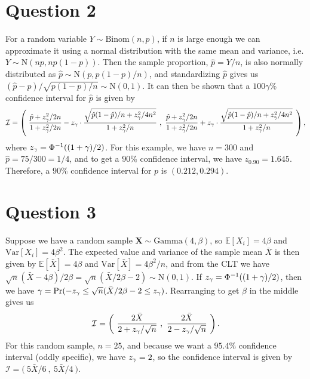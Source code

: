 \documentclass[10pt]{article}
\begin{document}
\section{Question 2} \noindent
For a random variable \(Y \sim \mathrm{Binom}(n, p)\), if \(n\) is large enough we can approximate it using a normal distribution with the same mean and 
variance, i.e. \(Y \sim \mathrm{N}(np, np(1-p))\). Then the sample proportion, \(\hat{p} = Y / n\), is also normally distributed as 
\(\hat{p} \sim \mathrm{N}(p, p(1-p)/n)\), and standardizing \(\hat{p}\) gives us \((\hat{p} - p) / \sqrt{p(1-p)/n} \sim \mathrm{N}(0,1)\). 
It can then be shown that a \(100\gamma\)\%{} confidence interval for \(\hat{p}\) is given by 
\begin{align*}
    \mathcal{I}
    = \left( ~ 
    \frac{\hat{p} + z_{\gamma}^2 / 2n}{1 + z_{\gamma}^2 / 2n} - z_{\gamma} \cdot \frac{\sqrt{\hat{p}(1 - \hat{p}) / n + z_{\gamma}^2 / 4n^2}}{1 + z_{\gamma}^2 / n} 
    ~,~ 
    \frac{\hat{p} + z_{\gamma}^2 / 2n}{1 + z_{\gamma}^2 / 2n} + z_{\gamma} \cdot \frac{\sqrt{\hat{p}(1 - \hat{p}) / n + z_{\gamma}^2 / 4n^2}}{1 + z_{\gamma}^2 / n}
    ~ \right),
\end{align*}
where \(z_{\gamma} = \Phi^{-1}((1 + \gamma)/2)\). For this example, we have \(n = 300\) and \(\hat{p} = 75 / 300 = 1/4\), and to get a \(90\)\%{}
confidence interval, we have \(z_{0.90} = 1.645\). Therefore, a \(90\)\%{} confidence interval for \(p\) is \((0.212, 0.294)\).

\section{Question 3} \noindent
Suppose we have a random sample \(\bm{X} \sim \mathrm{Gamma}(4, \beta)\), so \(\mathbb{E}[X_i] = 4\beta\) and \(\mathrm{Var}[X_i] = 4 \beta^2\). The expected 
value and variance of the sample mean \(\bar{X}\) is then given by \(\mathbb{E}[\bar{X}] = 4 \beta\) and \(\mathrm{Var}[\bar{X}] = 4 \beta^2 / n\), and from 
the CLT we have \(\sqrt{n}(\bar{X} - 4 \beta) / 2 \beta = \sqrt{n}(\bar{X} / 2 \beta - 2) \sim \mathrm{N}(0, 1)\). If \(z_{\gamma} = \Phi^{-1}((1 + \gamma) / 2)\),
then we have \(\gamma = \mathrm{Pr} (-z_{\gamma} \le \sqrt{n}(\bar{X} / 2 \beta - 2 \le z_{\gamma})\). Rearranging to get \(\beta\) in the middle gives us 
\begin{align*}
    \mathcal{I}
    = \left( ~ \frac{2 \bar{X}}{2 + z_{\gamma} / \sqrt{n}} ~,~ \frac{2 \bar{X}}{2 - z_{\gamma} / \sqrt{n}} ~ \right).
\end{align*}
For this random sample, \(n = 25\), and because we want a \(95.4\)\%{} confidence interval (oddly specific), we have \(z_{\gamma} = 2\), so the confidence interval 
is given by \(\mathcal{I} = \big( ~ 5 \bar{X} / 6 ~,~ 5 \bar{X} / 4 ~ \big)\). 
\end{document}
